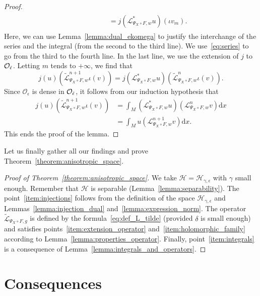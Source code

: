 \documentclass[AHL,Unicode,longabstracts,published]{cedram}
\newcommand{\p}[1]{\left(#1\right)}
\newcommand{\clO}{\mathcal{O}}
\newcommand{\clL}{\mathcal{L}}
\newcommand{\clH}{\mathcal{H}}
\newcommand{\rmd}{\mathrm{d}}
\let\oldtilde\tilde
\renewcommand*{\tilde}[1]{\mathchoice{\widetilde{#1}}{\widetilde{#1}}{\oldtilde{#1}}{\oldtilde{#1}}}
\newcommand{\clO}{\mathcal{O}}
\begin{document}
\begin{proof}
\begin{multline*}
\begin{aligned}
& \qquad \qquad = j\left(\clL_{\Psi_X \circ F,w}^* u\right)(\iota v_m).
\end{aligned}
\end{multline*}
Here, we can use Lemma~\ref{lemma:dual_ekomega} to justify the interchange of the series and the integral (from the second to the third line). We use~\eqref{eq:series} to go from the third to the fourth line. In the last line, we use the extension of $j$ to $\clO_{\tilde{\epsilon}}$. Letting $m$ tends to $+ \infty$, we find that
\begin{equation*}
j(u)\p{\widetilde{\clL}_{\Psi_X \circ F,w}^{n+1} \iota(v)} = j\left(\clL_{\Psi_X \circ F,w}^* u\right)\p{\widetilde{\clL}_{\Psi_X \circ F,w}^{n} \iota(v)}.
\end{equation*}
Since $\clO_\epsilon$ is dense in $\clO_{\tilde{\epsilon}}$, it follows from our induction hypothesis that
\begin{align*}
j(u)\p{\widetilde{\clL}_{\Psi_X \circ F,w}^{n+1} \iota(v)} & = \int_M \left(\clL_{\Psi_X \circ F,w}^* u\right) \left(\clL_{\Psi_X \circ F,w}^{n} v\right) \rmd x \\
& = \int_M u\left(\clL_{\Psi_X \circ F,w}^{n+1} v\right) \rmd x.
\end{align*}
This ends the proof of the lemma.
\end{proof}

Let us finally gather all our findings and prove Theorem~\ref{theorem:anisotropic_space}.

\begin{proof}[Proof of Theorem~\ref{theorem:anisotropic_space}]
We take $\clH = \clH_{\gamma,\epsilon}$ with $\gamma$ small enough. Remember that $\clH$ is separable (Lemma~\ref{lemma:separability}). The point~\eqref{item:injections} follows from the definition of the space $\clH_{\gamma,\epsilon}$ and Lemmas~\ref{lemma:injection_dual} and~\ref{lemma:expression_norm}. The operator $\widetilde{\clL}_{\Psi_X \circ F,g}$ is defined by the formula~\eqref{eq:def_L_tilde} (provided $\delta$ is small enough) and satisfies points~\eqref{item:extension_operator} and~\eqref{item:holomorphic_family} according to Lemma~\ref{lemma:properties_operator}. Finally, point~\eqref{item:integrals} is a consequence of Lemma~\ref{lemma:integrals_and_operators}.
\end{proof}

\section{Consequences}\label{section:consequences}
\end{document}
